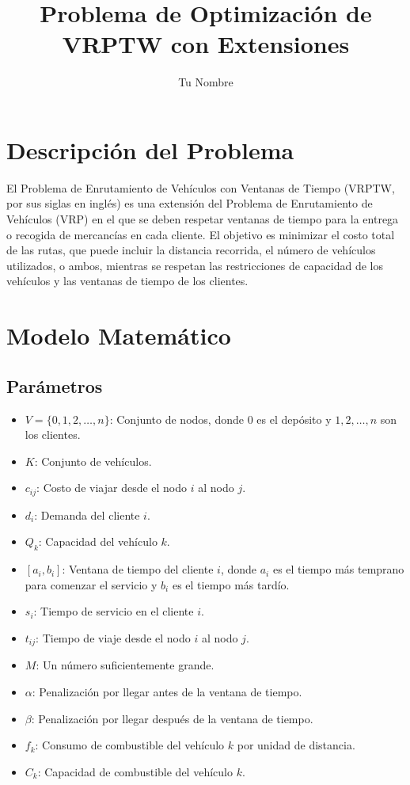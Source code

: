 \documentclass{article}
\title{Problema de Optimización de VRPTW con Extensiones}
\author{Tu Nombre}
\date{}
\begin{document}
\maketitle

\section{Descripción del Problema}

El Problema de Enrutamiento de Vehículos con Ventanas de Tiempo (VRPTW, por sus siglas en inglés) es una extensión del Problema de Enrutamiento de Vehículos (VRP) en el que se deben respetar ventanas de tiempo para la entrega o recogida de mercancías en cada cliente. El objetivo es minimizar el costo total de las rutas, que puede incluir la distancia recorrida, el número de vehículos utilizados, o ambos, mientras se respetan las restricciones de capacidad de los vehículos y las ventanas de tiempo de los clientes.

\section{Modelo Matemático}

\subsection{Parámetros}

\begin{itemize}
    \item \( V = \{0, 1, 2, \dots, n\} \): Conjunto de nodos, donde \( 0 \) es el depósito y \( 1, 2, \dots, n \) son los clientes.
    \item \( K \): Conjunto de vehículos.
    \item \( c_{ij} \): Costo de viajar desde el nodo \( i \) al nodo \( j \).
    \item \( d_i \): Demanda del cliente \( i \).
    \item \( Q_k \): Capacidad del vehículo \( k \).
    \item \( [a_i, b_i] \): Ventana de tiempo del cliente \( i \), donde \( a_i \) es el tiempo más temprano para comenzar el servicio y \( b_i \) es el tiempo más tardío.
    \item \( s_i \): Tiempo de servicio en el cliente \( i \).
    \item \( t_{ij} \): Tiempo de viaje desde el nodo \( i \) al nodo \( j \).
    \item \( M \): Un número suficientemente grande.
    \item \( \alpha \): Penalización por llegar antes de la ventana de tiempo.
    \item \( \beta \): Penalización por llegar después de la ventana de tiempo.
    \item \( f_k \): Consumo de combustible del vehículo \( k \) por unidad de distancia.
    \item \( C_k \): Capacidad de combustible del vehículo \( k \).
\end{itemize}
\end{document}
